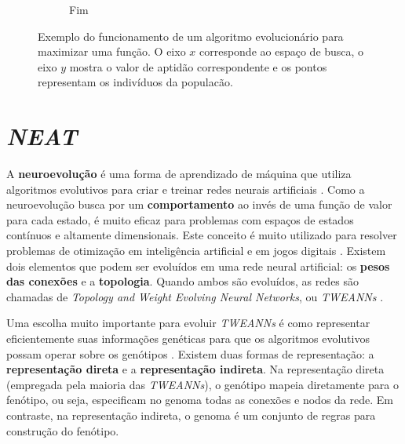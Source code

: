 \begin{figure}[htb!]
\begin{subfigure}[b]{0.3\textwidth}
		\caption{Fim}
		\label{fig:evolutionary-algorithms-function-end}
	\end{subfigure}
	\caption{Exemplo do funcionamento de um algoritmo evolucionário para
	maximizar uma função. O eixo $x$ corresponde ao espaço de busca, o eixo $y$
	mostra o valor de aptidão correspondente e os pontos representam os
	indivíduos da populacão.}
	\label{fig:evolutionary-algorithms-function}
\end{figure}


\section{\label{section:neat}\textit{NEAT}}
A \textbf{neuroevolução} é uma forma de aprendizado de máquina que utiliza
algoritmos evolutivos para criar e treinar redes neurais artificiais \cite[Cap.
4]{HandbookNeuroevolution}. Como a neuroevolução busca por um
\textbf{comportamento} ao invés de uma função de valor para cada estado, é muito
eficaz para problemas com espaços de estados contínuos e altamente dimensionais.
Este conceito é muito utilizado para resolver problemas de otimização em
inteligência artificial e em jogos digitais \cite{DBLP:journals/corr/RisiT14}.
Existem dois elementos que podem ser evoluídos em uma rede neural artificial: os
\textbf{pesos das conexões} e a \textbf{topologia}. Quando ambos são evoluídos,
as redes são chamadas de \textit{Topology and Weight Evolving Neural Networks},
ou \textit{TWEANNs} \cite[Cap. 4]{HandbookNeuroevolution}.

Uma escolha muito importante para evoluir \textit{TWEANNs} é como representar
eficientemente suas informações genéticas para que os algoritmos evolutivos
possam operar sobre os genótipos \cite[Cap. 4]{HandbookNeuroevolution}. Existem
duas formas de representação: a \textbf{representação direta} e a
\textbf{representação indireta}. Na representação direta (empregada pela maioria
das \textit{TWEANNs}), o genótipo mapeia diretamente para o fenótipo, ou seja,
especificam no genoma todas as conexões e nodos da rede. Em contraste, na
representação indireta, o genoma é um conjunto de regras para construção do
fenótipo. 


